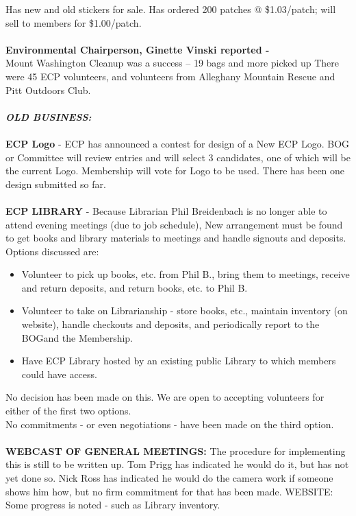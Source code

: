 \documentclass[10pt,a4paper]{article}
\begin{document}
\begin{multicols}{2}
Has new and old stickers for sale. Has ordered 200 patches @ \$1.03/patch; will sell to members for \$1.00/patch.
\\
\\
\textbf{Environmental  Chairperson, Ginette Vinski  reported -} \\
Mount Washington Cleanup was a success --  19 bags and more picked up  There were 45 ECP volunteers, and volunteers from Alleghany Mountain Rescue and Pitt Outdoors Club.
\\
\\
\textit{\textbf{OLD BUSINESS:}} 
\\
\\
\textbf{ECP Logo} -  ECP has announced a contest for design of a New ECP Logo.  BOG or Committee will review entries and will select 3 candidates, one of which will be the current Logo.  Membership will vote for Logo to be used.  There has been one design submitted so far.
\\
\\
\textbf{ECP LIBRARY} - Because Librarian Phil Breidenbach is no longer able to attend evening meetings (due to job schedule),  New arrangement must be found to get books and library materials to meetings and handle signouts and deposits.
Options discussed are: 
\begin{itemize}
\item Volunteer to pick up books, etc. from Phil B., bring them to meetings, receive and return deposits, and return books, etc. to Phil B.
\item Volunteer to take on Librarianship - store books, etc., maintain inventory (on website), handle checkouts and deposits, and periodically report to the BOGand the Membership.
\item Have ECP Library hosted by an existing public Library to which members could have access.
\end{itemize}
No decision has been made on this.  We are open to accepting volunteers for either of the first two options.\\
No commitments - or even negotiations - have been made on the third option.
\\
\\
\textbf{WEBCAST OF GENERAL MEETINGS:}
The procedure for implementing this is still to be written up.  Tom Prigg has indicated he would do it, but has not yet done so.  Nick Ross has indicated he would do the camera work if someone shows him how, but no firm commitment for that has been made.
WEBSITE:
Some progress is noted - such as Library inventory.

\end{multicols}
\end{document}
